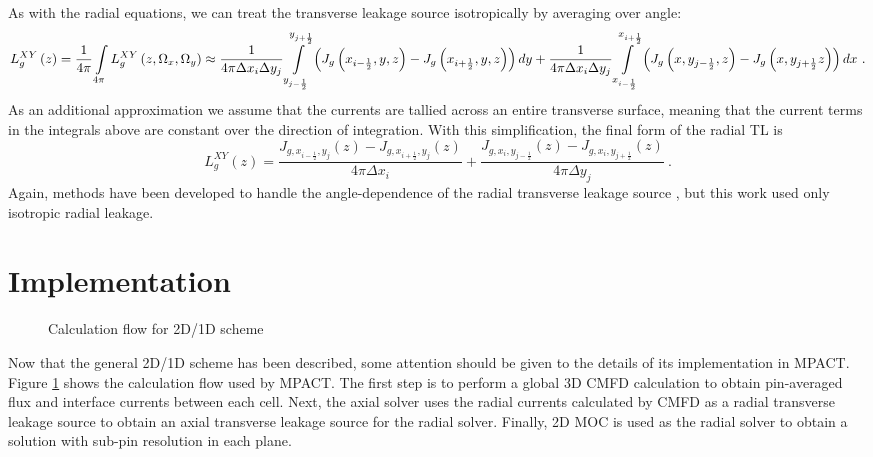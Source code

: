 As with the radial equations, we can treat the transverse leakage source isotropically by averaging over angle:
\begin{dmath}
{L_{g}^{XY}\left(z\right)} = {\frac{1}{4\pi}\intop_{4\pi} L_{g}^{XY}\left(z,\Omega_x,\Omega_y\right)} \approx {\frac{1}{4\pi\Delta x_i\Delta y_j}\intop_{y_{j-\frac{1}{2}}}^{y_{j+\frac{1}{2}}}\left( J_{g}\left(x_{i-\frac{1}{2}},y,z\right) - J_{g}\left(x_{i+\frac{1}{2}},y,z\right)\right)dy} + {\frac{1}{4\pi\Delta x_i\Delta y_j}\intop_{x_{i-\frac{1}{2}}}^{x_{i+\frac{1}{2}}}\left( J_{g}\left(x,y_{j-\frac{1}{2}},z\right) - J_{g}\left(x,y_{j+\frac{1}{2}}z\right)\right)dx}\ .
\end{dmath}
As an additional approximation we assume that the currents are tallied across an entire transverse surface, meaning that the current terms in the integrals above are constant over the direction of integration.  With this simplification, the final form of the radial TL is
\begin{equation}\label{e:radialTL}
L_g^{XY}\left(z\right) = \frac{J_{g,x_{i-\frac{1}{2}},y_j}\left(z\right) - J_{g,x_{i+\frac{1}{2}},y_j}\left(z\right)}{4\pi\Delta x_i} + \frac{J_{g,x_i,y_{j-\frac{1}{2}}}\left(z\right) - J_{g,x_i,y_{j+\frac{1}{2}}}\left(z\right)}{4\pi\Delta y_j}\ .
\end{equation}
Again, methods have been developed to handle the angle-dependence of the radial transverse leakage source \cite{StimpsonShaneThesis}, but this work used only isotropic radial leakage.

\section{Implementation}

\begin{figure}[h]
  \centering
  
  \caption{Calculation flow for 2D/1D scheme}\label{f:2d1d-flowchart}
\end{figure}

Now that the general 2D/1D scheme has been described, some attention should be given to the details of its implementation in MPACT.  Figure \ref{f:2d1d-flowchart} shows the calculation flow used by MPACT.  The first step is to perform a global 3D CMFD calculation to obtain pin-averaged flux and interface currents between each cell.  Next, the axial solver uses the radial currents calculated by CMFD as a radial transverse leakage source to obtain an axial transverse leakage source for the radial solver.  Finally, 2D MOC is used as the radial solver to obtain a solution with sub-pin resolution in each plane.

